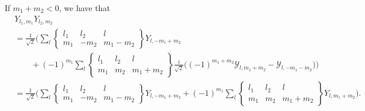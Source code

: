 \documentclass[10pt]{article}
\begin{document}
\begin{itemize}
		If $m_1+m_2 < 0$, we have that
		\begin{align*}
			& Y_{l_1, m_1} Y_{l_2, m_2} \\
			& = \frac{1}{\sqrt{2}} \bigg( 
			 \sum_{l} \begin{Bmatrix} l_1 & l_2 & l \\ m_1 & -m_2 & m_1 - m_2 \end{Bmatrix} Y_{l,-m_1+m_2} \\			
			& \qquad + (-1)^{m_1} \sum_{l} \begin{Bmatrix} l_1 & l_2 & l \\ m_1 & m_2 & m_1 + m_2 \end{Bmatrix} \frac{i}{\sqrt{2}} \bigg( (-1)^{m_1+m_2} \mathcal{Y}_{l, m_1+m_2}  - \mathcal{Y}_{l, -m_1-m_2} \bigg)
			\bigg) \\
			& = \frac{1}{\sqrt{2}} \bigg( 
			 \sum_{l} \begin{Bmatrix} l_1 & l_2 & l \\ m_1 & -m_2 & m_1 - m_2 \end{Bmatrix} Y_{l,-m_1+m_2}
			+ (-1)^{m_1} \sum_{l} \begin{Bmatrix} l_1 & l_2 & l \\ m_1 & m_2 & m_1 + m_2 \end{Bmatrix} Y_{l,m_1+m_2} \bigg).
		\end{align*}

	\end{itemize}	

	
	  
\end{document}
